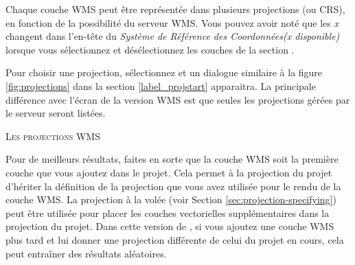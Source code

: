 Chaque couche WMS peut être représentée dans plusieurs projections (ou CRS), en fonction de la possibilité du serveur WMS. Vous pouvez avoir noté que les \textsl{x} changent dans l'en-tête du \textsl{Système de Référence des Coordonnées(x disponible)} lorsque vous sélectionnez et désélectionnez les couches de la section .

Pour choisir une projection, sélectionnez  et un dialogue similaire à la figure \ref{fig:projections} dans la section \ref{label_projstart} apparaitra. La principale différence avec l'écran de la version WMS est que seules les projections gérées par le serveur seront listées.

\begin{Tip}[ht]\caption{\textsc{Les projections WMS}}
Pour de meilleurs résultats, faites en sorte que la couche WMS soit la première couche que vous ajoutez dans le projet. Cela permet à la projection du projet d'hériter la définition de la projection que vous avez utilisée pour le rendu de la couche WMS. La projection à la volée (voir Section \ref{sec:projection-specifying}) peut être utilisée pour placer les couches vectorielles supplémentaires dans la projection du projet. Dans cette version  de \qg, si vous ajoutez une couche WMS plus tard et lui donner une projection différente de celui du projet en cours, cela peut entraîner des résultats aléatoires.
\end{Tip}


